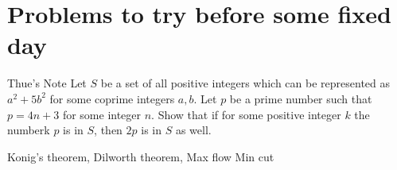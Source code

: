 \section{Problems to try before some fixed day}


\prob{}
{Thue's Note}{}{
    Let $S$ be a set of all positive integers which can be represented as
    $a^2+ 5b^2$ for some coprime integers $a,b$. Let $p$ be a prime number
    such that $p= 4n+ 3$ for some integer $n$. Show that if for some positive
    integer $k$ the numberk $p$ is in $S$, then $2p$ is in $S$ as well.
}

Konig's theorem, Dilworth theorem, Max flow Min cut

